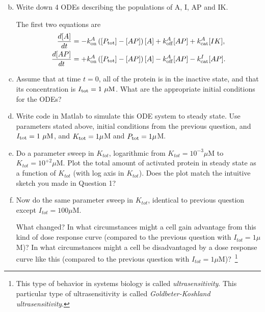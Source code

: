 \documentclass{exam}
\begin{document}
\begin{enumerate}[a.]
\setcounter{enumi}{1}
\item Write down 4 ODEs describing the populations of A, I, AP and IK.  

The first two equations are
\begin{align}
\frac{d{[A]}}{dt} &= -k_{\rm on}^A \left( [P_{\rm tot}] - [AP]\right) [A] + k_{\rm off}^A [AP] + k_{\rm cat}^A [IK],\\
\frac{d{[AP]}}{dt} &= +k_{\rm on}^A \left( [P_{\rm tot}] - [AP]\right) [A] - k_{\rm off}^A [AP] - k_{\rm cat}^I [AP].
\end{align}

\item Assume that at time $t=0$, all of the protein is in the inactive state, and that its concentration is $I_{\rm tot}=1~\mu\mbox{M}$. What are the appropriate initial conditions for the ODEs?

\item Write code in Matlab to simulate this ODE system to steady state. Use parameters stated above, initial conditions from the previous question, and $I_{\rm tot}=1~\mu\mbox{M}$, and $K_{\rm tot}=1\mu$M and $P_{\rm tot}=1\mu$M.

\item Do a parameter sweep in $K_{tot}$, logarithmic from $K_{tot} = 10^{-3} \mu$M to $K_{tot} = 10^{+2} \mu$M. Plot the total amount of activated protein in steady state as a function of $K_{tot}$ (with log axis in $K_{tot}$). Does the plot match the intuitive sketch you made in Question 1? 



\item Now do the same parameter sweep in $K_{tot}$, identical to previous question except $I_{tot}=100\mu$M. 

What changed? In what circumstances might a cell gain advantage from this kind of dose response curve (compared to the previous question with $I_{tot}=1\mu$M)? In what circumstances might a cell be disadvantaged by a dose response curve like this (compared to the previous question with $I_{tot}=1\mu$M)?~\footnote{This type of behavior in systems biology is called \emph{ultrasensitivity}. This particular type of ultrasensitivity is called \emph{Goldbeter-Koshland ultrasensitivity}.}


\end{enumerate}





  
\end{document}
